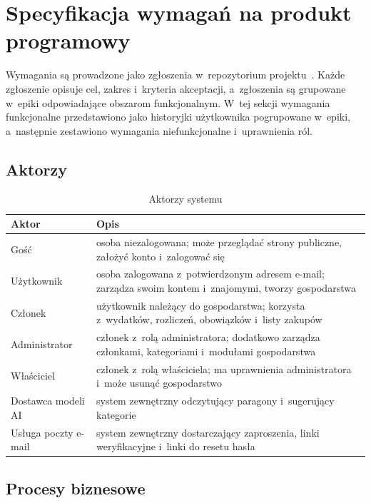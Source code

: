\section{Specyfikacja wymagań na produkt programowy}

Wymagania są prowadzone jako zgłoszenia w~repozytorium projektu~\cite{homesplit}. Każde zgłoszenie opisuje cel, zakres i~kryteria akceptacji, a~zgłoszenia są grupowane w~epiki odpowiadające obszarom funkcjonalnym. W~tej sekcji wymagania funkcjonalne przedstawiono jako historyjki użytkownika pogrupowane w~epiki, a~następnie zestawiono wymagania niefunkcjonalne i~uprawnienia ról.

\subsection{Aktorzy}

\begin{table}[H]
  \centering
  \caption{Aktorzy systemu}
  \label{tab:aktorzy}
  \begin{tabularx}{\textwidth}{@{}>{\raggedright\arraybackslash}p{}L@{}}
    \toprule
    Aktor & Opis \\
    \midrule
    Gość & osoba niezalogowana; może przeglądać strony publiczne, założyć konto i~zalogować się \\
    Użytkownik & osoba zalogowana z~potwierdzonym adresem e-mail; zarządza swoim kontem i~znajomymi, tworzy gospodarstwa \\
    Członek & użytkownik należący do gospodarstwa; korzysta z~wydatków, rozliczeń, obowiązków i~listy zakupów \\
    Administrator & członek z~rolą administratora; dodatkowo zarządza członkami, kategoriami i~modułami gospodarstwa \\
    Właściciel & członek z~rolą właściciela; ma uprawnienia administratora i~może usunąć gospodarstwo \\
    Dostawca modeli AI & system zewnętrzny odczytujący paragony i~sugerujący kategorie \\
    Usługa poczty e-mail & system zewnętrzny dostarczający zaproszenia, linki weryfikacyjne i~linki do resetu hasła \\
    \bottomrule
  \end{tabularx}
\end{table}

\subsection{Procesy biznesowe}
\label{sec:procesy}

